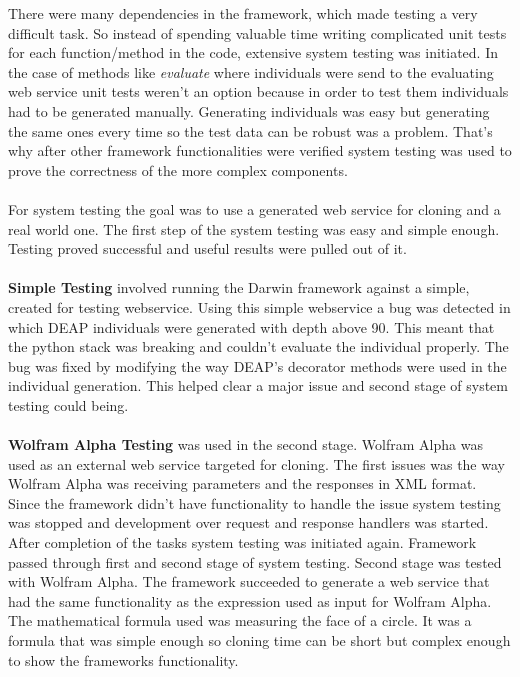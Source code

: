 There were many dependencies in the framework, which made testing a very difficult task. So instead of spending
valuable time writing complicated unit tests for each function/method in the code, extensive system testing was initiated.
 In the case of methods like \textit{evaluate} where individuals were send to the evaluating
web service unit tests weren't an option because in order to test them individuals had to be generated manually. Generating
individuals was easy but generating the same ones every time so the test data can be robust was a problem. That's why after
other framework functionalities were verified system testing was used to prove the correctness of the more complex components.
\paragraph{}
For system testing the goal was to use a generated web service for cloning and a real world one. The first step of the system
testing was easy and simple enough. Testing proved successful and useful results were pulled out of it. 
\paragraph{}
\textbf{Simple Testing}
 involved running the Darwin framework against a simple, created for testing webservice. 
Using this simple webservice a bug was
detected in which DEAP individuals were generated with depth above 90. This meant that the python stack was breaking and couldn't
evaluate the individual properly. The bug was fixed by modifying the way DEAP's decorator methods were used in the individual
generation. This helped clear a major issue and second stage of system testing could being.
\paragraph{}
\textbf{Wolfram Alpha Testing}
 was used in the second stage. Wolfram Alpha\cite{wolfram} 
was used as an external web service targeted for cloning. The first issues was the way Wolfram Alpha was receiving parameters and
the responses in XML format. Since the framework didn't have functionality to handle the issue system testing was stopped and development
over request and response handlers was started. After completion of the tasks system testing was initiated again. Framework passed through
first and second stage of system testing. Second stage was tested with Wolfram Alpha. The framework succeeded to generate a web service that had the same functionality
as the expression used as input for Wolfram Alpha. The mathematical formula used was measuring the face of a circle. It was a formula
that was simple enough so cloning time can be short but complex enough to show the frameworks functionality.
